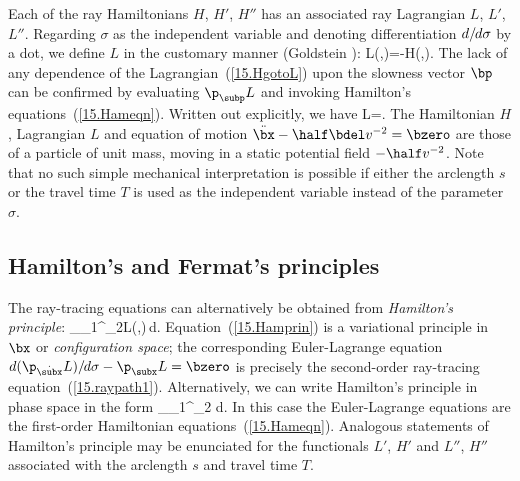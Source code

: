 Each of the ray Hamiltonians $H$, $H'$, $H''$ has
an associated ray Lagrangian $L$, $L'$, $L''$.
Regarding $\sigma$ as the independent variable and
denoting differentiation $d/\hspace{-0.3 mm}d\sigma$
by a dot, we define $L$ in the customary manner
(Goldstein \citeyear{goldstein80}):
\eq \label{15.HgotoL}
L(\bx,\dot{\bx})=\bp\cdot\dot{\bx}-H(\bx,\bp).
\en
The lack of any dependence of the Lagrangian~(\ref{15.HgotoL})
upon the slowness vector $\bp$ can be confirmed by evaluating $\p_{\subp}L$
and invoking Hamilton's equations~(\ref{15.Hameqn}).  Written out
explicitly, we have
\eq \label{15.Lag1}
L=.
\en
The Hamiltonian $H$, Lagrangian $L$ and equation of motion
$\ddot{\bx}-\half\bdel v^{-2}=\bzero$ are those of a particle
of unit mass, moving in a static potential field $-\half v^{-2}$.
Note that no such simple mechanical interpretation is possible if either the
arclength $s$ or the travel time $T$ is used as the independent
variable instead of the parameter $\sigma$.

\renewcommand{\thesubsection}{$\!\!\!\raise1.3ex\hbox{$\star$}\!\!$
\arabic{chapter}.\arabic{section}.\arabic{subsection}}
\subsection{Hamilton's and Fermat's principles}
%
%
\renewcommand{\thesubsection}{\arabic{chapter}.\arabic{section}.\arabic{subsection}}

The ray-tracing equations can alternatively be obtained from {\em Hamilton's
principle\/}:
\eq \label{15.Hamprin}
\delta\!\int_{\sigma_1}^{\sigma_2}L(\bx,\dot{\bx})\,d.
\en
Equation~(\ref{15.Hamprin}) is a variational principle in
$\bx$ or {\em configuration space\/};
%
the corresponding Euler-Lagrange
equation $d(\p_{\dot{\subx}}L)/\hspace{-0.3 mm}d\sigma
-\p_{\subx}L=\bzero$ is precisely the second-order ray-tracing
equation~(\ref{15.raypath1}).
Alternatively, we can write Hamilton's principle in
phase space in the form
\eq \label{15.Hamprin2}
\delta\!\int_{\sigma_1}^{\sigma_2}
d.
\en
In this case the Euler-Lagrange equations are the first-order
Hamiltonian equations~(\ref{15.Hameqn}).  Analogous statements
of Hamilton's principle may be enunciated for the functionals
$L'$, $H'$ and $L''$, $H''$ associated with the arc\-length $s$
and travel time $T$.

